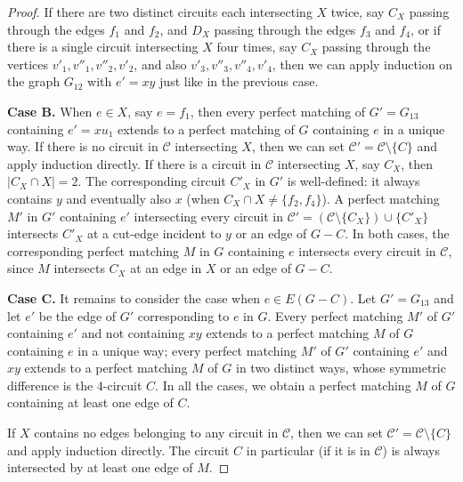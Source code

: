 \documentclass[]{theclass}
\begin{document}
\begin{proof}
If there are two distinct circuits each intersecting $X$ twice, say $C_X$ passing through the edges $f_1$ and $f_2$, and $D_X$ passing through the edges $f_3$ and $f_4$, or if there is a single circuit intersecting $X$ four times, say $C_X$ passing through the vertices $v'_1,v''_1,v''_2,v'_2$,  and also $v'_3,v''_3,v''_4,v'_4$, then we can apply induction on the graph $G_{12}$ with $e'=xy$ just like in the previous case.

\textbf{Case B.} When $e\in X$, say $e=f_1$, then every perfect matching of $G'=G_{13}$ containing $e'=xu_1$ extends to a perfect matching of $G$ containing $e$ in a unique way. If there is no circuit in $\mathcal{C}$ intersecting $X$, then we can set $\mathcal{C}'=\mathcal{C}\setminus \{C\}$ and apply induction directly. If there is a circuit in $\mathcal{C}$ intersecting $X$, say $C_X$, then $|C_X\cap X|=2$. The corresponding circuit $C'_X$ in $G'$ is well-defined: it always contains $y$ and eventually also $x$ (when $C_X\cap X\neq\{f_2,f_4\}$). A perfect matching $M'$ in $G'$ containing $e'$ intersecting every circuit in $\mathcal{C'}=(\mathcal{C} \setminus \{C_X\})\cup \{C'_X\}$ intersects $C'_X$ at a cut-edge incident to $y$ or an edge of $G-C$. In both cases, the corresponding perfect matching $M$ in $G$ containing $e$ intersects every circuit in $\mathcal{C}$, since $M$ intersects $C_X$ at an edge in $X$ or an edge of $G-C$.  

\textbf{Case C.} It remains to consider the case when $e\in E(G-C)$. Let $G'=G_{13}$ and let $e'$ be the edge of $G'$ corresponding to $e$ in $G$. Every perfect matching $M'$ of $G'$ containing $e'$ and not containing $xy$ extends to a perfect matching $M$ of $G$ containing $e$ in a unique way; every perfect matching $M'$ of $G'$ containing $e'$ and $xy$ extends to a perfect matching $M$ of $G$ in two distinct ways, whose symmetric difference is the 4-circuit $C$. In all the cases, we obtain a perfect matching $M$ of $G$ containing at least one edge of $C$.

If $X$ contains no edges belonging to any circuit in $\mathcal{C}$, then we can set $\mathcal{C}'=\mathcal{C}\setminus \{C\}$ and apply induction directly. The circuit $C$ in particular (if it is in $\mathcal{C}$) is always intersected by at least one edge of $M$.


\end{proof}
\end{document}
